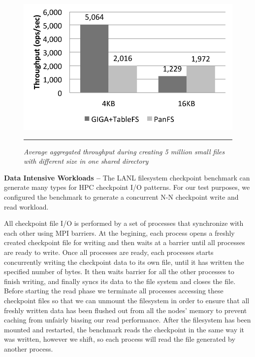 \begin{figure}[t]  %
\centerline{\includegraphics[scale=0.7]{./figs/small_file_creates}}
\vspace{10pt}
\caption{\normalsize
\textit{Average aggregated throughput during creating 5 million small files
with different size in one shared directory}
}
\vspace{10pt}
\hrule
\label{graph:smallfiles}
\end{figure}       %



\textbf{Data Intensive Workloads -- }
The LANL filesystem checkpoint benchmark can
generate many types for HPC checkpoint I/O patterns.
For our test purposes, we configured the benchmark to generate
a concurrent N-N checkpoint write and read workload.

All checkpoint file I/O is performed by a set of processes
that synchronize with each other using MPI barriers.
At the begining, each process opens a freshly created checkpoint file
for writing and then waits at a barrier until all processes are ready to write.
Once all processes are ready, each processes starts
concurrently writing the checkpoint data to its own file,
until it has written the specified number of bytes.
It then waits barrier for all the other processes to finish writing,
and finally syncs its data to the file system and closes the file.
Before starting the read phase we terminate all processes
accessing these checkpoint files so that
we can unmount the filesystem in order to ensure that
all freshly written data has been flushed out from all the nodes' memory
to prevent caching from unfairly biasing our read performance.
After the filesystem has been mounted and restarted,
the benchmark reads the checkpoint in the same way it was written,
however we shift, so each process will read
the file generated by another process.

